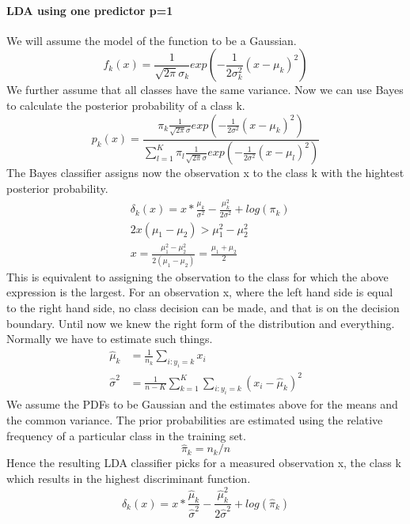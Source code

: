 \documentclass[../document.tex]{subfiles}
\begin{document}
	\paragraph{LDA using one predictor p=1}
	We will assume the model of the function to be a Gaussian.
	\begin{equation}
		f_{k}(x)=\frac{1}{\sqrt{2\pi}\sigma_{k}}exp(-\frac{1}{2\sigma_{k}^2}(x-\mu_{k})^2)
	\end{equation}
	We further assume that all classes have the same variance. Now we can use Bayes to calculate the posterior probability of a class k.
	\begin{equation}
	p_{k}(x)=\frac{\pi_{k}\frac{1}{\sqrt{2\pi}\sigma}exp(-\frac{1}{2\sigma^2}(x-\mu_{k})^2)}{\sum_{l=1}^{K}\pi_{l}\frac{1}{\sqrt{2\pi}\sigma}exp(-\frac{1}{2\sigma^2}(x-\mu_{l})^2)}
	\end{equation}
	The Bayes classifier assigns now the observation x to the class k with the hightest posterior probability.
	\begin{equation}
	\begin{split}
		&\delta_{k}(x)=x*\frac{\mu_{k}}{\sigma^2}-\frac{\mu_{k}^2}{2\sigma^2}+log(\pi_{k})\\
		&2x(\mu_{1}-\mu_{2})>\mu_{1}^2-\mu_{2}^2\\
		&x=\frac{\mu_{1}^2-\mu_{2}^2}{2(\mu_{1}-\mu_{2})}=\frac{\mu_{1}+\mu_{2}}{2}
	\end{split}
	\end{equation}
	This is equivalent to assigning the observation to the class for which the above expression is the largest.
	For an observation x, where the left hand side is equal to the right hand side, no class decision can be made, and that is on the decision boundary. Until now we knew the right form of the distribution and everything. Normally we have to estimate such things.
	\begin{equation}
	\begin{split}
		\hat{\mu}_{k}&=\frac{1}{n_{k}}\sum_{i:y_{i}=k}x_{i}\\
		\hat{\sigma}^2&=\frac{1}{n-K}\sum_{k=1}^{K}\sum_{i:y_{i}=k}(x_{i}-\hat{\mu}_{k})^2
	\end{split}
	\end{equation}
	We assume the PDFs to be Gaussian and the estimates above for the means and the common variance. The prior probabilities are estimated using the relative frequency of a particular class in the training set.
	\begin{equation}
		\hat{\pi}_{k}=n_{k}/n
	\end{equation}
	Hence the resulting LDA classifier picks for a measured observation x, the class k which results in the highest discriminant function.
	\begin{equation}
		\hat{\delta}_{k}(x)=x*\frac{\hat{\mu}_{k}}{\hat{\sigma}^2}-\frac{\hat{\mu}_{k}^2}{2\hat{\sigma}^2}+log(\hat{\pi}_{k})
	\end{equation}
\end{document}
